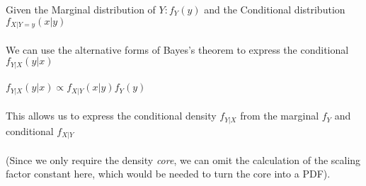 \documentclass[11pt]{article}   	%
\begin{document}
Given the Marginal distribution of $ Y : f_Y(y) $ and the Conditional distribution $ f_{X | Y = y}(x | y) $ \\
\\
We can use the alternative forms of Bayes's theorem to express the conditional $ f_{Y | X} (y|x) $ \\
\\
$ f_{Y | X} (y | x) \propto f_{X | Y} (x | y) f_Y (y) $ \\
\\
This allows us to express the conditional density $ f_{Y | X} $ from the marginal $ f_Y $ and conditional $ f_{X | Y} $ \\
\\ 
(Since we only require the density \emph{core}, we can omit the calculation of the scaling factor constant here, which would be needed to turn the core into a PDF). \\
\\
\end{document}

